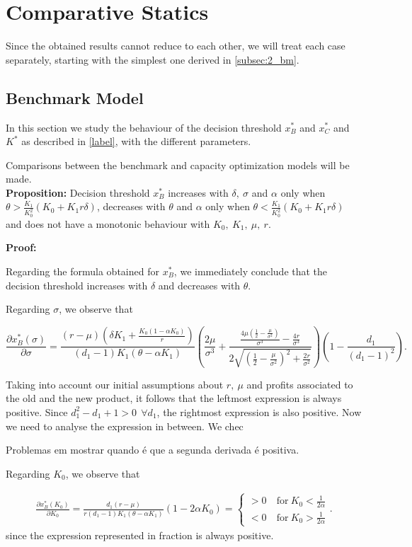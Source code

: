 \section{Comparative Statics}
Since the obtained results cannot reduce to each other, we will treat each case separately, starting with the simplest one derived in \ref{subsec:2_bm}.

\subsection{Benchmark Model}
In this section we study the behaviour of the decision threshold $x^*_B$ and $x^*_{C}$ and $K^*$ as described in \eqref{label}, with
the different parameters.

Comparisons between the benchmark and capacity optimization models will be made.\\
\textbf{Proposition:}
Decision threshold $x^*_B$ increases with $ \delta, \ \sigma$ and $\alpha$ only when $\theta > \frac{K_1}{ K_0^2} (K_0+K_1 r \delta)$, decreases with $\theta$ and $\alpha$ only when $\theta < \frac{K_1}{ K_0^2} (K_0+K_1 r \delta)$ and does not have a monotonic behaviour with $K_0, \ K_1, \ \mu, \ r$.


\textbf{Proof:}

Regarding the formula obtained for  $x^*_B$, we immediately conclude that the decision threshold increases with $\delta$ and decreases with $\theta$.

Regarding $\sigma$, we observe that


$$    \frac{\partial x^*_B ( \sigma ) }{\partial \sigma}= 
\frac{(r-\mu )  \left(\delta  K_1+\frac{K_0(1-\alpha K_0)}{r}\right)}{(d_1-1) K_1 (\theta -\alpha  K_1)} \left(\frac{2 \mu }{\sigma ^3}+\frac{\frac{4 \mu  \left(\frac{1}{2}-\frac{\mu }{\sigma ^2}\right)}{\sigma ^3}-\frac{4 r}{\sigma ^3}}{2 \sqrt{\left(\frac{1}{2}-\frac{\mu }{\sigma ^2}\right)^2+\frac{2 r}{\sigma ^2}}}\right) \left( 1- \frac{d_1}{(d_1-1)^2} \right).$$


Taking into account our initial assumptions about $r, \ \mu$ and profits associated to the old and the new product, it follows that the leftmost expression is always positive. Since $d_1^2-d_1+1>0 \ \ \forall d_1$, the rightmost expression is also positive. Now we need to analyse the expression in between. We chec

Problemas em mostrar quando é que a segunda derivada é positiva.

Regarding $K_0$, we observe that

\begin{align*}
    \frac{\partial x^*_B ( K_0 ) }{\partial K_0}= 
\frac{d_1 (r-\mu )}{r (d_1-1)K_1(\theta-\alpha K_1)} (1-2\alpha K_0)
=
\begin{cases}
>0 &\ \text{for} \ K_0<\frac{1}{2 \alpha}\\
<0 &\ \text{for} \ K_0>\frac{1}{2 \alpha}
\end{cases}.
\end{align*}
since the expression represented in fraction is always positive.


